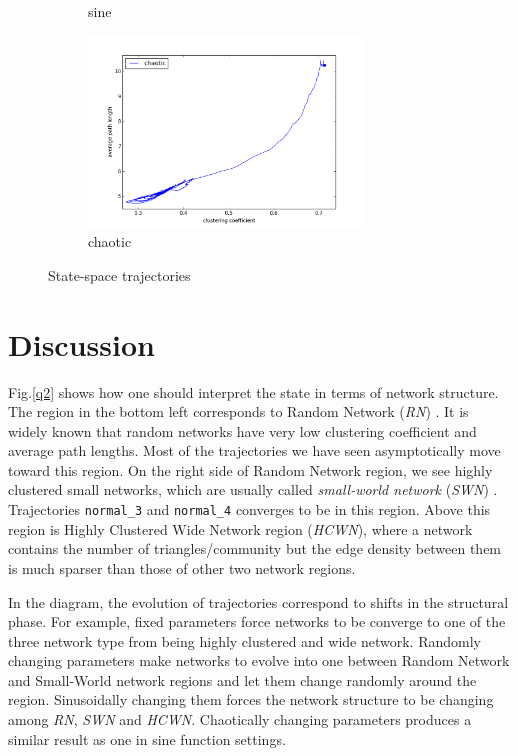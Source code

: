 \documentclass{article}
\begin{document}
\begin{figure}[h]
\begin{subfigure}{.5\textwidth}
  \caption{sine}
  \label{q1_3}
\end{subfigure}%
\hfill
\begin{subfigure}{.5\textwidth}
  \centering
  \includegraphics[height=2in]{figs/chaotic.png}
  \caption{chaotic}
  \label{q1_4}
\end{subfigure}
\caption{State-space trajectories}
\label{q1}
\end{figure}
 
 \section{Discussion}
 Fig.\ref{q2} shows how one should interpret the state in terms of network structure. The region in the bottom left corresponds to Random Network (\textit{RN}) \cite{RandomNetwork}. It is widely known that random networks have very low clustering coefficient and average path lengths. Most of the trajectories we have seen asymptotically move toward this region. On the right side of Random Network region, we see highly clustered small networks, which are usually called \textit{small-world network} (\textit{SWN}) \cite{j1998collective}. Trajectories \texttt{normal\_3} and \texttt{normal\_4} converges to be in this region. Above this region is Highly Clustered Wide Network region (\textit{HCWN}), where a network contains the number of triangles/community but the edge density between them is much sparser than those of other two network regions. 
 
 In the diagram, the evolution of trajectories correspond to shifts in the structural phase. For example, fixed parameters force networks to be converge to one of the three network type from being highly clustered and wide network. Randomly changing parameters make networks to evolve into one between Random Network and Small-World network regions and let them change randomly around the region. Sinusoidally changing them forces the network structure to be changing among \textit{RN}, \textit{SWN} and \textit{HCWN}. Chaotically changing parameters produces a similar result as one in sine function settings.
  
\end{document}
